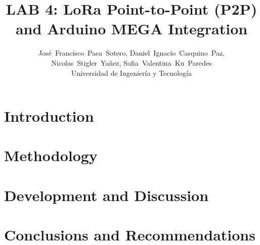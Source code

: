 \documentclass[journal]{IEEEtran}
\newcommand{\labpath}{}
\begin{document}
\raggedbottom
\title{LAB 4: LoRa Point-to-Point (P2P) and Arduino MEGA Integration}
\author{José~Francisco~Paca~Sotero, Daniel~Ignacio~Casquino~Paz,\\
Nicolas~Stigler~Yañez, Sofia~Valentina~Ku~Paredes\\
Universidad de Ingeniería y Tecnología}
\maketitle
\section{Introduction}

\section{Methodology}

\section{Development and Discussion}

\FloatBarrier
{}
\section{Conclusions and Recommendations}

\newpage


\end{document}
